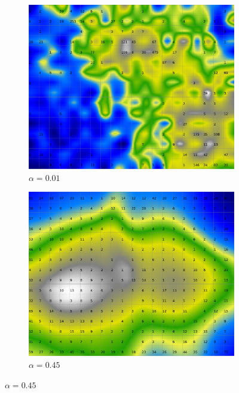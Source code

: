 \documentclass{acm_proc_article-sp}
\begin{document}
\begin{figure}
\centering
    \centering
    \begin{subfigure}[b]{0.24\linewidth}
        \includegraphics[width=\linewidth]{img/wine-20x16-smoothed-data-histogram-alpha-0,01-f-149}
        \caption{$\alpha=0.01$}
        \label{fig:wine-20x16-smoothed-data-histogram-alpha-0,01-f-149}
    \end{subfigure}
    \begin{subfigure}[b]{0.24\linewidth}
        \includegraphics[width=\linewidth]{img/wine-20x16-smoothed-data-histogram-alpha-0,45-f-149}
        \caption{$\alpha=0.45$}

\end{subfigure}
\end{figure}
\end{document}
